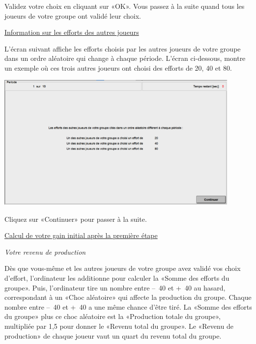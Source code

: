 \begin{Article}
\begin{refsection}[Lebourges]
\begin{appendices}
Validez votre choix en cliquant sur «OK». Vous passez à la suite quand
tous les joueurs de votre groupe ont validé leur choix.
\vspace{0,3cm}

\newpage

\ul{Information sur les efforts des autres joueurs}

\vspace{0,2cm}
L'écran suivant affiche les efforts choisis par les autres joueurs de
votre groupe dans un ordre aléatoire qui change à chaque période.
L'écran ci-dessous, montre un exemple où ces trois autres joueurs ont
choisi des efforts de 20, 40 et 80.

\vspace{0,2cm}

\includegraphics[width = 0.9\textwidth]{05_fig5-annexII.png}

Cliquez sur «Continuer» pour passer à la suite.
\vspace{0,3cm}

\ul{Calcul de votre gain initial après la première étape}

\vspace{0,2cm}

\emph{Votre revenu de production}

\vspace{0,2cm}
Dès que vous-même et les autres joueurs de votre groupe avez validé vos
choix d'effort, l'ordinateur les additionne pour calculer la «Somme des
efforts du groupe». Puis, l'ordinateur tire un nombre entre --~40 et
+~40 au hasard, correspondant à un «Choc aléatoire» qui affecte la
production du groupe. Chaque nombre entre --~40 et +~40 a une même
chance d'être tiré. La «Somme des efforts du groupe» plus ce choc
aléatoire est la «Production totale du groupe», multipliée par 1,5
pour donner le «Revenu total du groupe». Le «Revenu de production»
de chaque joueur vaut un quart du revenu total du groupe.


\end{appendices}
\end{refsection}
\end{Article}
